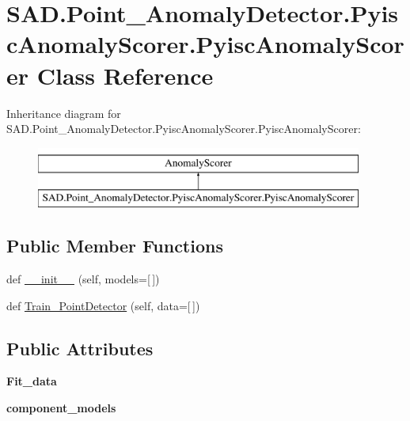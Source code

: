 \hypertarget{classSAD_1_1Point__AnomalyDetector_1_1PyiscAnomalyScorer_1_1PyiscAnomalyScorer}{}\section{S\+A\+D.\+Point\+\_\+\+Anomaly\+Detector.\+Pyisc\+Anomaly\+Scorer.\+Pyisc\+Anomaly\+Scorer Class Reference}
\label{classSAD_1_1Point__AnomalyDetector_1_1PyiscAnomalyScorer_1_1PyiscAnomalyScorer}
Inheritance diagram for S\+A\+D.\+Point\+\_\+\+Anomaly\+Detector.\+Pyisc\+Anomaly\+Scorer.\+Pyisc\+Anomaly\+Scorer\+:\begin{figure}[H]
\begin{center}
\leavevmode
\includegraphics[height=2.000000cm]{classSAD_1_1Point__AnomalyDetector_1_1PyiscAnomalyScorer_1_1PyiscAnomalyScorer}
\end{center}
\end{figure}
\subsection*{Public Member Functions}
\begin{DoxyCompactItemize}
\item 
def \hyperlink{classSAD_1_1Point__AnomalyDetector_1_1PyiscAnomalyScorer_1_1PyiscAnomalyScorer_abc3bc5cec9cb7a036e27d38fd754a971}{\+\_\+\+\_\+init\+\_\+\+\_\+} (self, models=\mbox{[}$\,$\mbox{]})
\item 
def \hyperlink{classSAD_1_1Point__AnomalyDetector_1_1PyiscAnomalyScorer_1_1PyiscAnomalyScorer_ae27cbcb8c835a0fa016b9eafa4045052}{Train\+\_\+\+Point\+Detector} (self, data=\mbox{[}$\,$\mbox{]})
\end{DoxyCompactItemize}
\subsection*{Public Attributes}
\begin{DoxyCompactItemize}
\item 
{\bfseries Fit\+\_\+data}\hypertarget{classSAD_1_1Point__AnomalyDetector_1_1PyiscAnomalyScorer_1_1PyiscAnomalyScorer_a48edccc0d69161cf1e0787ea9597d9d6}{}\label{classSAD_1_1Point__AnomalyDetector_1_1PyiscAnomalyScorer_1_1PyiscAnomalyScorer_a48edccc0d69161cf1e0787ea9597d9d6}

\item 
{\bfseries component\+\_\+models}\hypertarget{classSAD_1_1Point__AnomalyDetector_1_1PyiscAnomalyScorer_1_1PyiscAnomalyScorer_ab0acbf34c58d6323750d493b75b85e6f}{}\label{classSAD_1_1Point__AnomalyDetector_1_1PyiscAnomalyScorer_1_1PyiscAnomalyScorer_ab0acbf34c58d6323750d493b75b85e6f}

\end{DoxyCompactItemize}


